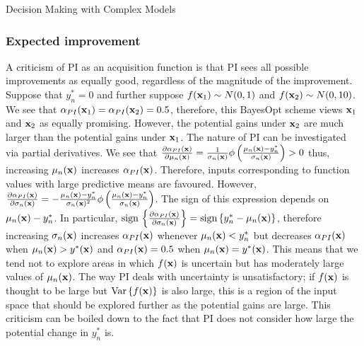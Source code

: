\begin{chapter}{Decision Making with Complex Models \label{Chap:optimisation}}
\subsubsection{Expected improvement}
A criticism of PI as an acquisition function is that PI sees all possible improvements as equally good, regardless of the magnitude of the improvement. Suppose that $y^{*}_n = 0$ and further suppose $f(\mathbf{x}_1) \sim N(0, 1)$ and $f(\mathbf{x}_2) \sim N(0, 10)$. We see that $\alpha_{PI}(\mathbf{x}_1) = \alpha_{PI}(\mathbf{x}_2) = 0.5$, therefore, this BayesOpt scheme views $\mathbf{x}_1$ and $\mathbf{x}_2$ as equally promising. However, the potential gains under $\mathbf{x}_2$ are much larger than the potential gains under $\mathbf{x}_1$. The nature of PI can be investigated via partial derivatives. We see that $\frac{\partial \alpha_{PI}(\mathbf{x})}{\partial \mu_n(\mathbf{x})} = \frac{1}{\sigma_n(\mathbf{x})}\phi\left( \frac{\mu_n(\mathbf{x}) - y^{*}_n}{\sigma_n(\mathbf{x})} \right) > 0$ thus, increasing $\mu_n(\mathbf{x})$ increases $\alpha_{PI}(\mathbf{x})$. Therefore, inputs corresponding to function values with large predictive means are favoured. However, $\frac{\partial \alpha_{PI}(\mathbf{x})}{\partial \sigma_n(\mathbf{x})} = -\frac{\mu_n(\mathbf{x}) - y^{*}_n}{\sigma_n(\mathbf{x})^2}\phi\left( \frac{\mu_n(\mathbf{x}) - y^{*}_n}{\sigma_n(\mathbf{x})} \right)$. The sign of this expression depends on $\mu_n(\mathbf{x}) - y^{*}_n$. In particular, $\text{sign}\, \left\{\frac{\partial \alpha_{PI}(\mathbf{x})}{\partial \sigma_n(\mathbf{x})}\right\} = \text{sign}\,\{y^{*}_n - \mu_n(\mathbf{x})\}$, therefore increasing $\sigma_n(\mathbf{x})$ increases $\alpha_{PI}(\mathbf{x})$ whenever $\mu_n(\mathbf{x}) < y^{*}_n$ but decreases $\alpha_{PI}(\mathbf{x})$ when $\mu_n(\mathbf{x}) > y^{*}(\mathbf{x})$ and $\alpha_{PI}(\mathbf{x}) = 0.5$ when $\mu_n(\mathbf{x}) = y^{*}(\mathbf{x})$. This means that we tend not to explore areas in which $f(\mathbf{x})$ is uncertain but has moderately large values of $\mu_n(\mathbf{x})$. The way PI deals with uncertainty is unsatisfactory; if $f(\mathbf{x})$ is thought to be large but $\mathrm{Var}\,\{f(\mathbf{x})\}$ is also large, this is a region of the input space that should be explored further as the potential gains are large. This criticism can be boiled down to the fact that PI does not consider how large the potential change in $y_n^{*}$ is.


\end{chapter}

